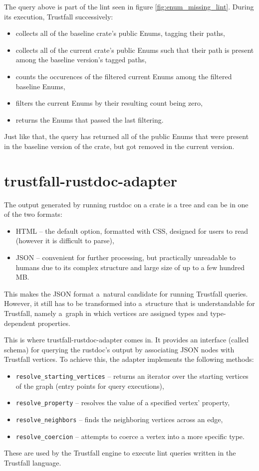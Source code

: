 \documentclass[licencjacka,en]{pracamgr}
\begin{document}
The query above is part of the lint seen in figure \ref{fig:enum_missing_lint}.
During its execution, Trustfall successively:
\begin{itemize}
	\item collects all of the baseline crate's public Enums, tagging their paths,
	\item collects all of the current crate's public Enums such that their path is present among
		the baseline version's tagged paths,
	\item counts the occurences of the filtered current Enums among the filtered baseline Enums,
	\item filters the current Enums by their resulting count being zero,
	\item returns the Enums that passed the last filtering.
\end{itemize}
Just like that, the query has returned all of the public Enums that were present in the baseline
version of the crate, but got removed in the current version.

\section{trustfall-rustdoc-adapter}\label{r:section_trustfall_rustdoc_adapter}
The output generated by running rustdoc on a crate is a tree and can be in one of the two formats:
\begin{itemize}
	\item HTML -- the default option, formatted with CSS, designed for users to read (however it is
		difficult to parse),
	\item JSON -- convenient for further processing, but practically unreadable to humans due to its
		complex structure and large size of up to a few hundred MB.
\end{itemize}
This makes the JSON format a~natural candidate for running Trustfall queries. However, it still has
to be transformed into a~structure that is understandable for Trustfall, namely a~graph in which
vertices are assigned types and type-dependent properties.

This is where trustfall-rustdoc-adapter comes in. It provides an interface (called schema) for querying
the rustdoc's output by associating JSON nodes with Trustfall vertices. To achieve this, the adapter
implements the following methods:
\begin{itemize}
	\item \texttt{resolve\_starting\_vertices} -- returns an iterator over the starting vertices of
		the graph (entry points for query executions),
	\item \texttt{resolve\_property} -- resolves the value of a specified vertex' property,
	\item \texttt{resolve\_neighbors} -- finds the neighboring vertices across an edge,
	\item \texttt{resolve\_coercion} -- attempts to coerce a vertex into a more specific type.
\end{itemize}
These are used by the Trustfall engine to execute lint queries written in the Trustfall language.
\end{document}
